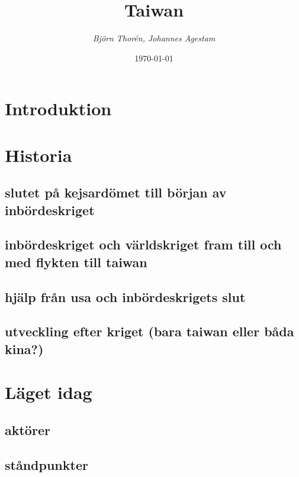 \documentclass[a4paper,10pt]{article}
\title{\Huge\bf{Taiwan}\\}
\author{\emph{Björn Thorén, Johannes Agestam}}
\date{\today}
\begin{document}
\null  %
\nointerlineskip  %
\vfill
\let\snewpage \newpage
\let\newpage \relax
\maketitle
\let \newpage \snewpage
\vfill 
\break %

\newpage

\section{Introduktion}

\section{Historia}

\subsection{slutet på kejsardömet till början av inbördeskriget}

\subsection{inbördeskriget och världskriget fram till och med flykten till taiwan}

\subsection{hjälp från usa och inbördeskrigets slut}

\subsection{utveckling efter kriget (bara taiwan eller båda kina?)}


\section{Läget idag}


\subsection{aktörer}

\subsection{ståndpunkter}
\end{document}
